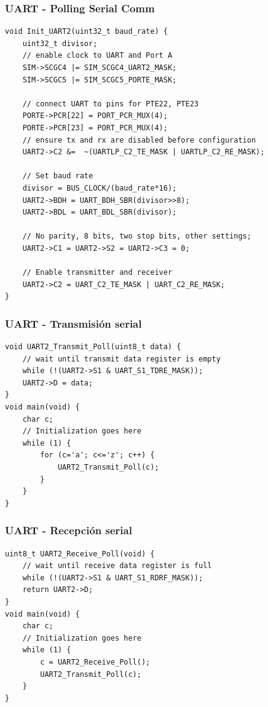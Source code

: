 \documentclass[10.5pt,scale=1.0,t,aspectratio=169,hyperref={pdfpagelabels=false}]{beamer}
\begin{document}
\begin{frame}[fragile]
	\frametitle{UART - Polling Serial Comm}
	{\tiny
		\begin{lstlisting}[style=CStyle]
void Init_UART2(uint32_t baud_rate) {
	uint32_t divisor;
	// enable clock to UART and Port A
	SIM->SCGC4 |= SIM_SCGC4_UART2_MASK;
	SIM->SCGC5 |= SIM_SCGC5_PORTE_MASK;
	
	// connect UART to pins for PTE22, PTE23
	PORTE->PCR[22] = PORT_PCR_MUX(4);
	PORTE->PCR[23] = PORT_PCR_MUX(4);
	// ensure tx and rx are disabled before configuration
	UART2->C2 &=  ~(UARTLP_C2_TE_MASK | UARTLP_C2_RE_MASK);
	
	// Set baud rate
	divisor = BUS_CLOCK/(baud_rate*16);
	UART2->BDH = UART_BDH_SBR(divisor>>8);
	UART2->BDL = UART_BDL_SBR(divisor);
	
	// No parity, 8 bits, two stop bits, other settings;
	UART2->C1 = UART2->S2 = UART2->C3 = 0;
	
	// Enable transmitter and receiver
	UART2->C2 = UART_C2_TE_MASK | UART_C2_RE_MASK;	
}
		\end{lstlisting}		
	}
\end{frame}
\begin{frame}[fragile]
	\frametitle{UART - Transmisión serial}
	{\tiny
		\begin{lstlisting}[style=CStyle]
void UART2_Transmit_Poll(uint8_t data) {
	// wait until transmit data register is empty
	while (!(UART2->S1 & UART_S1_TDRE_MASK));
	UART2->D = data;
}	
void main(void) {
	char c;	
	// Initialization goes here
	while (1) {
		for (c='a'; c<='z'; c++) {
			UART2_Transmit_Poll(c);
		}
	}
}
		\end{lstlisting}		
	}
\end{frame}
\begin{frame}[fragile]
	\frametitle{UART - Recepción serial}
	{\tiny
		\begin{lstlisting}[style=CStyle]
uint8_t UART2_Receive_Poll(void) {
	// wait until receive data register is full
	while (!(UART2->S1 & UART_S1_RDRF_MASK));
	return UART2->D;
}	
void main(void) {
	char c;	
	// Initialization goes here
	while (1) {
		c = UART2_Receive_Poll();
		UART2_Transmit_Poll(c);
	}
}
		\end{lstlisting}		
	}
\end{frame}
\end{document}
